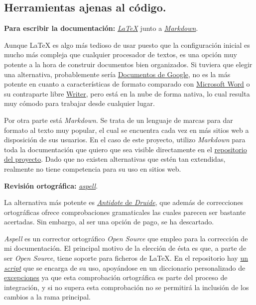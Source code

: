 \subsection{Herramientas ajenas al código.}

\textbf{Para escribir la documentación:} \href{https://www.latex-project.org/}{\textit{LaTeX}} junto a \href{https://www.markdownguide.org/getting-started/}{\textit{Markdown}}.

Aunque LaTeX es algo más tedioso de usar puesto que la configuración inicial es mucho más compleja que cualquier procesador de textos, es una opción muy potente a la hora de construir documentos bien organizados. Si tuviera que elegir una alternativa, probablemente sería \href{https://workspace.google.com/intl/es/products/docs/}{Documentos de Google}, no es la más potente en cuanto a características de formato comparado con \href{https://www.microsoft.com/es-es/microsoft-365/word}{Microsoft Word} o su contraparte libre \href{https://es.libreoffice.org/descubre/writer/}{Writer}, pero está en la nube de forma nativa, lo cual resulta muy cómodo para trabajar desde cualquier lugar.

Por otra parte está \textit{Markdown}. Se trata de un lenguaje de marcas para dar formato al texto muy popular, el cual se encuentra cada vez en más sitios web a disposición de sus usuarios. En el caso de este proyecto, utilizo \textit{Markdown} para toda la documentación que quiero que sea visible directamente en el \href{https://github.com/Anglepi/My-Many-Reads}{repositorio del proyecto}. Dado que no existen alternativas que estén tan extendidas, realmente no tiene competencia para su uso en sitios web.

\textbf{Revisión ortográfica:} \href{http://aspell.net/}{\textit{aspell}}.

La alternativa más potente es \href{https://www.antidote.info/en/}{\textit{Antidote} de \textit{Druide}}, que además de correcciones ortográficas ofrece comprobaciones gramaticales las cuales parecen ser bastante acertadas. Sin embargo, al ser una opción de pago, se ha descartado.

\textit{Aspell} es un corrector ortográfico \textit{Open Source} que empleo para la corrección de mi documentación. El principal motivo de la elección de ésta es que, a parte de ser \textit{Open Source}, tiene soporte para ficheros de LaTeX. En el repositorio hay \href{https://github.com/Anglepi/My-Many-Reads/blob/main/scripts/spellcheck.sh}{un \textit{script}} que se encarga de su uso, apoyándose en un diccionario personalizado de \href{https://github.com/Anglepi/My-Many-Reads/blob/main/scripts/spellcheckDictionary.txt}{excepciones} ya que esta comprobación ortográfica es parte del proceso de integración, y si no supera esta comprobación no se permitirá la inclusión de los cambios a la rama principal.


